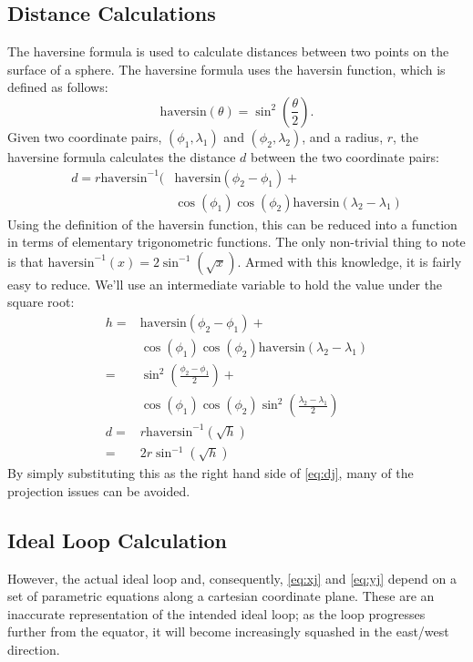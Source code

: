 \documentclass[twocolumn,11pt]{article}
\begin{document}
\subsection{Distance Calculations}
The haversine formula is used to calculate distances between two points on the
surface of a sphere. The haversine formula uses the haversin function,
which is defined as follows:
\newcommand{\haversin}{\mbox{haversin}}
\[ \haversin (\theta) = \sin^2(\frac{\theta}{2}). \]
Given two coordinate pairs, $(\phi_1, \lambda_1)$ and $(\phi_2, \lambda_2)$,
and a radius, $r$, the haversine formula calculates the distance $d$ between
the two coordinate pairs:
\begin{align*}
  d = r\haversin^{-1}(&\haversin(\phi_2 - \phi_1) + \\
  & \cos(\phi_1)\cos(\phi_2)\haversin(\lambda_2 -\lambda_1)
\end{align*}
Using the definition of the haversin function, this can be reduced into a
function in terms of elementary trigonometric functions. The only non-trivial
thing to note is that $\haversin^{-1}(x) = 2\sin^{-1}(\sqrt{x})$. Armed with
this knowledge, it is fairly easy to reduce. We'll use an intermediate variable
to hold the value under the square root:
\begin{align*}
  h = & \haversin(\phi_2-\phi_1) + \\
  & \cos(\phi_1)\cos(\phi_2)\haversin(\lambda_2-\lambda_1) \\
  = & \sin^2\left(\frac{\phi_2 - \phi_1}{2}\right) + \\
  & \cos(\phi_1)\cos(\phi_2)\sin^2\left(\frac{\lambda_2-\lambda_1}{2}\right)\\
  d = & r\haversin^{-1}\left(\sqrt{h}\right) \\
  = & 2r\sin^{-1}\left(\sqrt{h}\right)
\end{align*}
By simply substituting this as the right hand side of \eqref{eq:dj}, many of the
projection issues can be avoided.

\subsection{Ideal Loop Calculation}

However, the actual ideal loop and, consequently,
\eqref{eq:xj} and \eqref{eq:yj} depend on a set of parametric equations along
a cartesian coordinate plane. These are an inaccurate representation of the
intended ideal loop; as the loop progresses further from the equator, it will
become increasingly squashed in the east/west direction.
\end{document}
